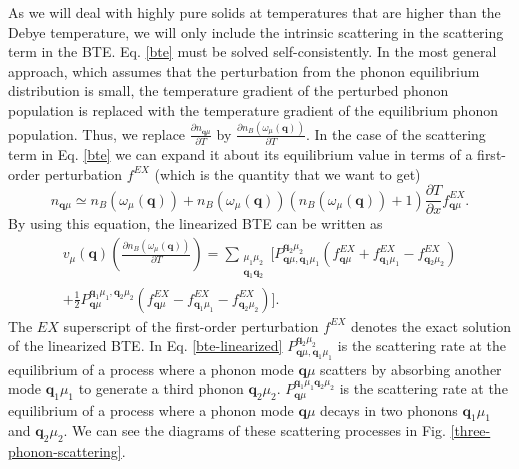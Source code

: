 As we will deal with highly pure solids at temperatures that are higher than the Debye temperature, we will only include the intrinsic scattering in the scattering term in the BTE. Eq. \ref{bte} must be solved 
self-consistently. In the most general approach\cite{ziman2001electrons}, which assumes that the perturbation from the phonon equilibrium distribution is small, the temperature gradient of the perturbed phonon 
population is replaced with the temperature gradient of the equilibrium phonon population. Thus, we replace $\frac{\partial n_{\mathbf{q}\mu}}{\partial T}$ by $\frac{\partial n_{B}(\omega_{\mu}(\mathbf{
q}))}{\partial T}$. In the case of the scattering term in Eq. \ref{bte} we can expand it about its equilibrium value in terms of a first-order perturbation $f^{EX}$ (which is the quantity that we want to get)
\begin{equation}
 n_{\mathbf{q}\mu}\simeq n_{B}(\omega_{\mu}(\mathbf{q}))+n_{B}(\omega_{\mu}(\mathbf{q}))(n_{B}(\omega_{\mu}(\mathbf{q}))+1)\frac{\partial T}{\partial x}f^{EX}_{\mathbf{q}\mu}.
\end{equation} 
By using this equation, the linearized BTE can be written as\cite{sparavigna2002lattice}
\begin{multline}
 \label{bte-linearized}
 v_{\mu}(\mathbf{q})\left(\frac{\partial n_{B}(\omega_{\mu}(\mathbf{q}))}{\partial T}\right)=\sum\limits_{\substack{\mu_{1}\mu_{2} \\ \mathbf{q}_{1}\mathbf{q}_{2}}}
 [P_{\mathbf{q}\mu,\mathbf{q}_{1}\mu_{1}}^{\mathbf{q}_{2}\mu_{2}}(f_{\mathbf{q}\mu}^{EX}+f_{\mathbf{q}_{1}\mu_{1}}^{EX}-f_{\mathbf{q}_{2}\mu_{2}}^{EX}) \\ 
 +\frac{1}{2}P_{\mathbf{q}\mu}^{\mathbf{q}_{1}\mu_{1},\mathbf{q}_{2}\mu_{2}}(f_{\mathbf{q}\mu}^{EX}-f_{\mathbf{q}_{1}\mu_{1}}^{EX}-f_{\mathbf{q}_{2}\mu_{2}}^{EX})].
\end{multline}
The $EX$ superscript of the first-order perturbation $f^{EX}$ denotes the exact solution of the linearized BTE. 
In Eq. \ref{bte-linearized} $P_{\mathbf{q}\mu,\mathbf{q}_{1}\mu_{1}}^{\mathbf{q}_{2}\mu_{2}}$ is the scattering rate at the equilibrium of a process where a phonon mode $\mathbf{q}\mu$ scatters by 
absorbing another mode $\mathbf{q}_{1}\mu_{1}$ to generate a third phonon $\mathbf{q}_{2}\mu_{2}$. $P_{\mathbf{q}\mu}^{\mathbf{q}_{1}\mu_{1}\mathbf{q}_{2}\mu_{2}}$ is the scattering rate at the equilibrium of a process 
where a phonon mode $\mathbf{q}\mu$ decays in two phonons $\mathbf{q}_{1}\mu_{1}$ and $\mathbf{q}_{2}\mu_{2}$. We can see the diagrams of these scattering processes in Fig. \ref{three-phonon-scattering}.  
